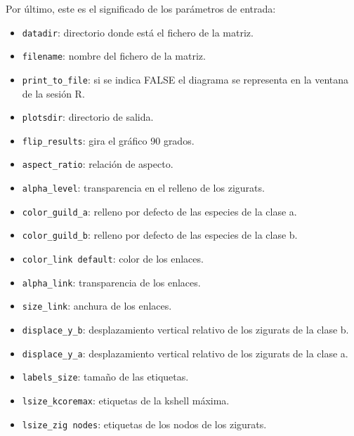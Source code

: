 \noindent Por último, este es el significado de los parámetros de entrada:
\small
\begin{itemize}

\item \texttt{datadir}:  directorio donde está el fichero de la matriz.

\item \texttt{filename}: nombre del fichero de la matriz.

\item \texttt{print\_to\_file}: si se indica FALSE el diagrama se representa en la ventana de la sesión R.

\item \texttt{plotsdir}: directorio de salida.

\item \texttt{flip\_results}: gira el gráfico 90 grados.

\item \texttt{aspect\_ratio}: relación de aspecto.

\item \texttt{alpha\_level}: transparencia en el relleno de los zigurats.

\item \texttt{color\_guild\_a}: relleno por defecto de las especies de la clase a.

\item \texttt{color\_guild\_b}: relleno por defecto de las especies de la clase b.

\item \texttt{color\_link default}: color de los enlaces.

\item \texttt{alpha\_link}: transparencia de los enlaces.

\item \texttt{size\_link}: anchura de los enlaces.

\item \texttt{displace\_y\_b}: desplazamiento vertical relativo de los zigurats de la clase b.

\item \texttt{displace\_y\_a}: desplazamiento vertical relativo de los zigurats de la clase a.

\item \texttt{labels\_size}: tamaño de las etiquetas.

\item \texttt{lsize\_kcoremax}: etiquetas de la kshell máxima.

\item \texttt{lsize\_zig nodes}: etiquetas de los nodos de los zigurats.


\end{itemize}
